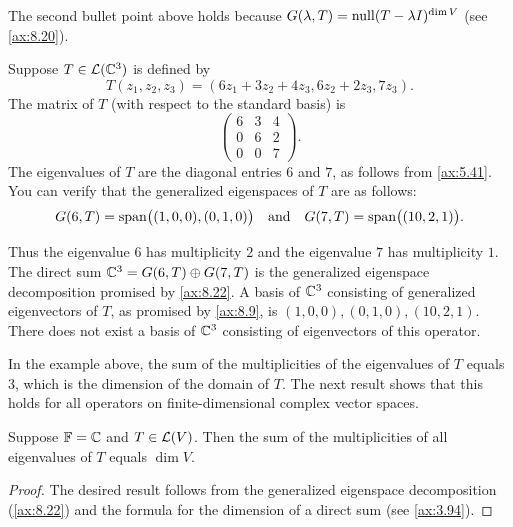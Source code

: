 The second bullet point above holds because
$G(\lambda,T)=\operatorname{null}(T-\lambda I)^{\operatorname{dim} V}$ (see \ref{ax:8.20}).

\begin{example}\label{ax:8.24}
Suppose $T\in\mathcal{L}(\mathbb{C}^3)$ is defined by
\[ T(z_1,z_2,z_3) = (6z_1+3z_2+4z_3,6z_2+2z_3,7z_3). \]
The matrix of $T$ (with respect to the standard basis) is
\[ \begin{pmatrix} 6 & 3 & 4\\ 0 & 6 & 2\\ 0 & 0 & 7 \end{pmatrix}. \]
The eigenvalues of $T$ are the diagonal entries $6$ and $7$, as follows from
\ref{ax:5.41}. You can verify that the generalized eigenspaces of $T$ are as
follows:
\[ G(6,T) = \operatorname{span}\bigl((1,0,0),(0,1,0)\bigr) \quad\text{and}\quad
   G(7,T) = \operatorname{span}\bigl((10,2,1)\bigr). \]

Thus the eigenvalue $6$ has multiplicity $2$ and the eigenvalue $7$ has
multiplicity $1$. The direct sum $\mathbb{C}^3=G(6,T)\oplus G(7,T)$ is the generalized
eigenspace decomposition promised by \ref{ax:8.22}. A basis of $\mathbb{C}^3$
consisting of generalized eigenvectors of $T$, as promised by \ref{ax:8.9}, is
$(1,0,0),(0,1,0),(10,2,1)$. There does not exist a basis of $\mathbb{C}^3$ consisting
of eigenvectors of this operator.
\end{example}

%
In the example above, the sum of the multiplicities of the eigenvalues of $T$
equals $3$, which is the dimension of the domain of $T$. The next result shows
that this holds for all operators on finite-dimensional complex vector spaces.

\begin{result}\label{ax:8.25}
Suppose $\mathbb{F}=\mathbb{C}$ and $T\in\mathcal{L}(V)$. Then the sum of the multiplicities of all
eigenvalues of $T$ equals $\dim V$.
\end{result}

\begin{proof}
The desired result follows from the generalized eigenspace decomposition
(\ref{ax:8.22}) and the formula for the dimension of a direct sum (see
\ref{ax:3.94}).
\end{proof}

